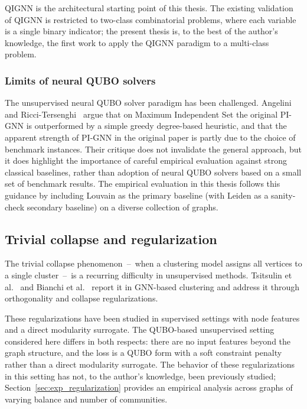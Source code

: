 QIGNN is the architectural starting point of this thesis. The
existing validation of QIGNN is restricted to two-class
combinatorial problems, where each variable is a single binary
indicator; the present thesis is, to the best of the author's
knowledge, the first work to apply the QIGNN paradigm to a
multi-class problem.

\subsubsection{Limits of neural QUBO solvers}
\label{sec:rw_critique}

The unsupervised neural QUBO solver paradigm has been challenged.
Angelini and Ricci-Tersenghi~\cite{angelini2023modern} argue that
on Maximum Independent Set the original PI-GNN is outperformed by a
simple greedy degree-based heuristic, and that the apparent
strength of PI-GNN in the original paper is partly due to the choice
of benchmark instances. Their critique does not invalidate the
general approach, but it does highlight the importance of careful
empirical evaluation against strong classical baselines, rather than
adoption of neural QUBO solvers based on a small set of benchmark
results. The empirical evaluation in this thesis follows this
guidance by including Louvain as the primary baseline (with Leiden as a sanity-check secondary baseline) on a
diverse collection of graphs.

\subsection{Trivial collapse and regularization}
\label{sec:rw_collapse}

The trivial collapse phenomenon~--~when a clustering model assigns
all vertices to a single cluster~--~is a recurring difficulty in
unsupervised methods. Tsitsulin et al.~\cite{tsitsulin2020graph}
and Bianchi et al.~\cite{bianchi2020spectral} report it in GNN-based
clustering and address it through orthogonality and collapse
regularizations.

These regularizations have been studied in supervised settings with
node features and a direct modularity surrogate. The QUBO-based
unsupervised setting considered here differs in both respects: there
are no input features beyond the graph structure, and the loss is a
QUBO form with a soft constraint penalty rather than a direct
modularity surrogate. The behavior of these regularizations in this
setting has not, to the author's knowledge, been previously studied;
Section~\ref{sec:exp_regularization} provides an empirical analysis
across graphs of varying balance and number of communities.

\newpage